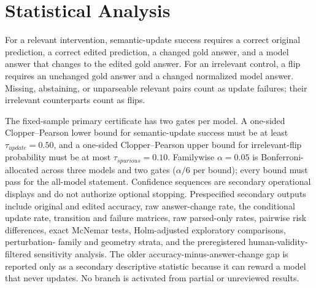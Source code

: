 \section{Statistical Analysis}
For a relevant intervention, semantic-update success requires a correct original prediction, a
correct edited prediction, a changed gold answer, and a model answer that changes to the edited gold
answer. For an irrelevant control, a flip requires an unchanged gold answer and a changed normalized
model answer. Missing, abstaining, or unparseable relevant pairs count as update failures; their
irrelevant counterparts count as flips.

The fixed-sample primary certificate has two gates per model. A one-sided Clopper--Pearson lower bound
for semantic-update success must be at least $\tau_{update}=0.50$, and a one-sided
Clopper--Pearson upper bound for irrelevant-flip probability must be at most
$\tau_{spurious}=0.10$. Familywise $\alpha=0.05$ is Bonferroni-allocated across three models and two
gates ($\alpha/6$ per bound); every bound must pass for the all-model statement. Confidence sequences
are secondary operational displays and do not authorize optional stopping. Prespecified secondary
outputs include original and edited accuracy, raw answer-change rate, the conditional update rate,
transition and failure matrices, raw parsed-only rates,
pairwise risk differences, exact McNemar tests, Holm-adjusted exploratory comparisons, perturbation-
family and geometry strata, and the preregistered human-validity-filtered sensitivity analysis. The
older accuracy-minus-answer-change gap is reported only as a secondary descriptive statistic because
it can reward a model that never updates. No branch is activated from partial or unreviewed results.
